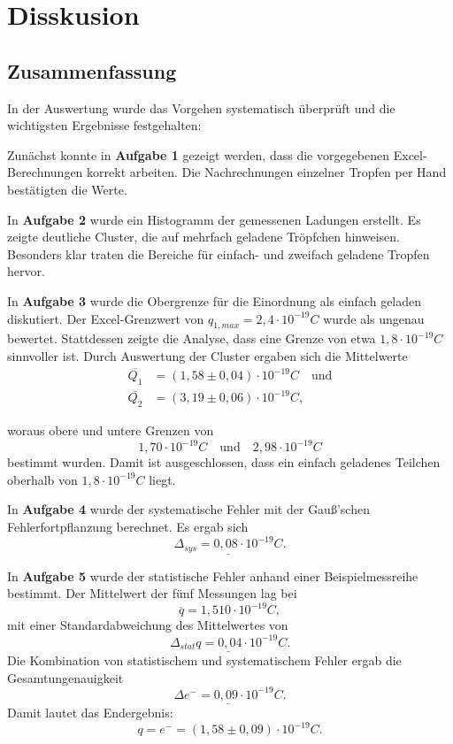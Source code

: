 \chapter{Disskusion}

\section{Zusammenfassung}


In der Auswertung wurde das Vorgehen systematisch überprüft und die wichtigsten Ergebnisse festgehalten:  

Zunächst konnte in \textbf{Aufgabe 1} gezeigt werden, dass die vorgegebenen Excel-Berechnungen korrekt arbeiten. Die Nachrechnungen einzelner Tropfen per Hand bestätigten die Werte.  

In \textbf{Aufgabe 2} wurde ein Histogramm der gemessenen Ladungen erstellt. Es zeigte deutliche Cluster, die auf mehrfach geladene Tröpfchen hinweisen. Besonders klar traten die Bereiche für einfach- und zweifach geladene Tropfen hervor.  

In \textbf{Aufgabe 3} wurde die Obergrenze für die Einordnung als einfach geladen diskutiert. Der Excel-Grenzwert von $q_{1,max} = 2,4 \cdot 10^{-19} C$ wurde als ungenau bewertet. Stattdessen zeigte die Analyse, dass eine Grenze von etwa $1,8 \cdot 10^{-19} C$ sinnvoller ist.  
Durch Auswertung der Cluster ergaben sich die Mittelwerte  
\begin{align*}
    \overline{Q_1} &= (1,58 \pm 0,04) \cdot 10^{-19} C \quad \text{und} \\
    \overline{Q_2} &= (3,19 \pm 0,06) \cdot 10^{-19} C,
\end{align*}
 
woraus obere und untere Grenzen von  
\[
1,70 \cdot 10^{-19} C \quad \text{und} \quad 2,98 \cdot 10^{-19} C
\]  
bestimmt wurden. Damit ist ausgeschlossen, dass ein einfach geladenes Teilchen oberhalb von $1,8 \cdot 10^{-19} C$ liegt.  

In \textbf{Aufgabe 4} wurde der systematische Fehler mit der Gauß’schen Fehlerfortpflanzung berechnet. Es ergab sich  
\[
\underline{\Delta_{sys} = 0,08 \cdot 10^{-19} C}.
\]  

In \textbf{Aufgabe 5} wurde der statistische Fehler anhand einer Beispielmessreihe bestimmt. Der Mittelwert der fünf Messungen lag bei  
\[
\overline{q} = 1,510 \cdot 10^{-19} C,
\]  
mit einer Standardabweichung des Mittelwertes von  
\[
\underline{\Delta_{stat} q = 0,04 \cdot 10^{-19} C}.
\]  
Die Kombination von statistischem und systematischem Fehler ergab die Gesamtungenauigkeit  
\[
\underline{\Delta e^- = 0,09 \cdot 10^{-19} C}.
\]  
Damit lautet das Endergebnis:  
\[
\boxed{q = e^- = (1,58 \pm 0,09) \cdot 10^{-19} C}.
\]  

